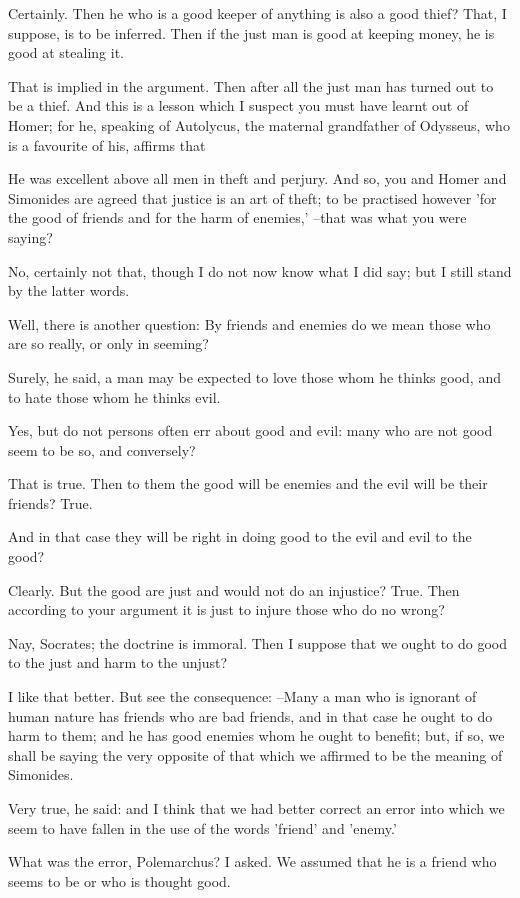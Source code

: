 Certainly.
Then he who is a good keeper of anything is also a good thief?
That, I suppose, is to be inferred.
Then if the just man is good at keeping money, he is good at stealing it.

That is implied in the argument.
Then after all the just man has turned out to be a thief. And this is a lesson which I suspect you must have learnt out of Homer; for he, speaking of Autolycus, the maternal grandfather of Odysseus, who is a favourite of his, affirms that

He was excellent above all men in theft and perjury. And so, you and Homer and Simonides are agreed that justice is an art of theft; to be practised however 'for the good of friends and for the harm of enemies,' --that was what you were saying?

No, certainly not that, though I do not now know what I did say; but I still stand by the latter words.

Well, there is another question: By friends and enemies do we mean those who are so really, or only in seeming?

Surely, he said, a man may be expected to love those whom he thinks good, and to hate those whom he thinks evil.

Yes, but do not persons often err about good and evil: many who are not good seem to be so, and conversely?

That is true.
Then to them the good will be enemies and the evil will be their friends? True.

And in that case they will be right in doing good to the evil and evil to the good?

Clearly.
But the good are just and would not do an injustice?
True.
Then according to your argument it is just to injure those who do no wrong?

Nay, Socrates; the doctrine is immoral.
Then I suppose that we ought to do good to the just and harm to the unjust?

I like that better.
But see the consequence: --Many a man who is ignorant of human nature has friends who are bad friends, and in that case he ought to do harm to them; and he has good enemies whom he ought to benefit; but, if so, we shall be saying the very opposite of that which we affirmed to be the meaning of Simonides.

Very true, he said: and I think that we had better correct an error into which we seem to have fallen in the use of the words 'friend' and 'enemy.'

What was the error, Polemarchus? I asked.
We assumed that he is a friend who seems to be or who is thought good.

